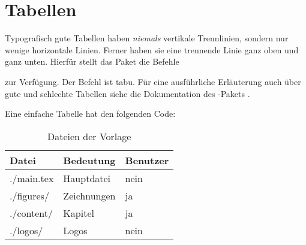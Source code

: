\section{Tabellen}
\label{sec:Tabellen}

Typografisch gute Tabellen haben \emph{niemals} vertikale Trennlinien,
sondern nur wenige horizontale Linien.
Ferner haben sie eine trennende Linie ganz oben und ganz unten.
Hierfür stellt das Paket  die Befehle
\begin{itemize*}
  \item {}
	\item {}
	\item {}
\end{itemize*}
zur Verfügung.
Der Befehl  ist tabu.
Für eine ausführliche Erläuterung auch über gute und schlechte Tabellen
siehe die Dokumentation des -Pakets \cite{Fear2005}.

Eine einfache Tabelle hat den folgenden Code:
\begin{latex}[caption={Einfache Tabelle in \LaTeX},label={lst:tables}]
\begin{table}%
  \centering%
  \begin{tabular}{l l l}%
	  \toprule%
    Datei       &  Bedeutung    &  Benutzer \\
		\midrule%
    ./main.tex  &  Hauptdatei   &  nein     \\
    ./figures/  &  Zeichnungen  &  ja       \\
    ./content/  &  Kapitel      &  ja       \\
    ./logos/    &  Logos        &  nein     \\
		\bottomrule%
  \end{tabular}%
  \caption{Dateien der Vorlage}%
  \label{tab:files-dirs-of-template}%
\end{table}
\end{latex}


